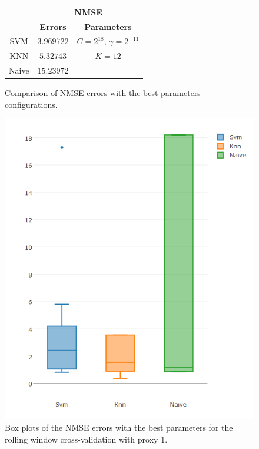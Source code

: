 \begin{figure}[!h]
\centering
\begin{tabular}{|c|c|c|}
   \hline
   & \multicolumn{2}{|c|}{\textbf{NMSE}} \\ \cline{2-3}
   & \textbf{Errors} & \textbf{Parameters}          \\ \hline
   SVM  &  $3.969722$      & $C = 2^{18}$, $\gamma = 2^{-11}$          \\ 
   KNN & $5.32743$  & $K = 12$ \\ 
   Naive & $15.23972$ &      \\ 
   \hline
   \end{tabular}
\caption{Comparison of NMSE errors with the best parameters configurations.}
\label{fig:table10yNMSEp1}
\centering
\includegraphics[width=\linewidth]{img/10yproxy1NMSE.png}
\caption{Box plots of the NMSE errors with the best parameters for the rolling window cross-validation with proxy 1.}\label{fig:table10yNMSEp1a}
\end{figure}


